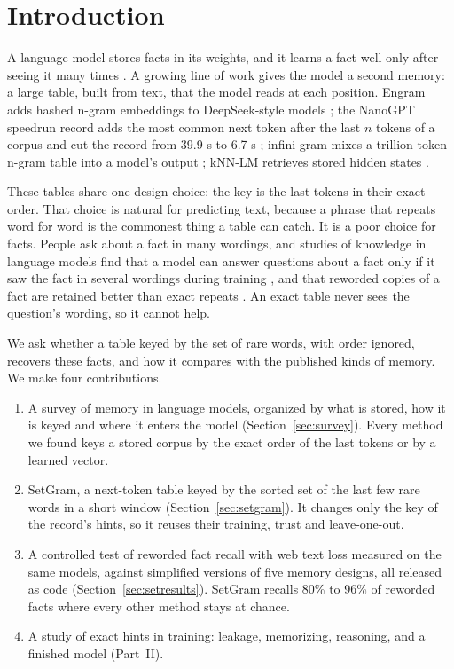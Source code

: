 \documentclass[11pt]{article}
\begin{document}
\section{Introduction}
A language model stores facts in its weights, and it learns a fact well only after seeing it many times \cite{kandpal}. A growing line of work gives the model a second memory: a large table, built from text, that the model reads at each position. Engram adds hashed n-gram embeddings to DeepSeek-style models \cite{engram}; the NanoGPT speedrun record adds the most common next token after the last $n$ tokens of a corpus and cut the record from 39.9 s to 6.7 s \cite{brunborg,pr367}; infini-gram mixes a trillion-token n-gram table into a model's output \cite{infinigram}; kNN-LM retrieves stored hidden states \cite{knnlm}.

These tables share one design choice: the key is the last tokens in their exact order. That choice is natural for predicting text, because a phrase that repeats word for word is the commonest thing a table can catch. It is a poor choice for facts. People ask about a fact in many wordings, and studies of knowledge in language models find that a model can answer questions about a fact only if it saw the fact in several wordings during training \cite{physics31}, and that reworded copies of a fact are retained better than exact repeats \cite{chang}. An exact table never sees the question's wording, so it cannot help.

We ask whether a table keyed by the set of rare words, with order ignored, recovers these facts, and how it compares with the published kinds of memory. We make four contributions.
\begin{enumerate}
\item A survey of memory in language models, organized by what is stored, how it is keyed and where it enters the model (Section~\ref{sec:survey}). Every method we found keys a stored corpus by the exact order of the last tokens or by a learned vector.
\item SetGram, a next-token table keyed by the sorted set of the last few rare words in a short window (Section~\ref{sec:setgram}). It changes only the key of the record's hints, so it reuses their training, trust and leave-one-out.
\item A controlled test of reworded fact recall with web text loss measured on the same models, against simplified versions of five memory designs, all released as code (Section~\ref{sec:setresults}). SetGram recalls 80\% to 96\% of reworded facts where every other method stays at chance.
\item A study of exact hints in training: leakage, memorizing, reasoning, and a finished model (Part~II).
\end{enumerate}
\end{document}
